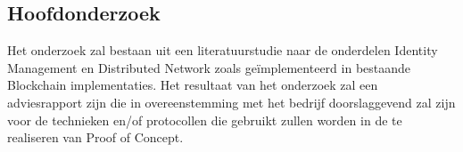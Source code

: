 \subsection{Hoofdonderzoek}

Het onderzoek zal bestaan uit een literatuurstudie naar de onderdelen Identity Management en Distributed Network zoals geïmplementeerd in bestaande Blockchain implementaties. Het resultaat van het onderzoek zal een adviesrapport zijn die in overeenstemming met het bedrijf doorslaggevend zal zijn voor de technieken en/of protocollen die gebruikt zullen worden in de te realiseren van Proof of Concept.
